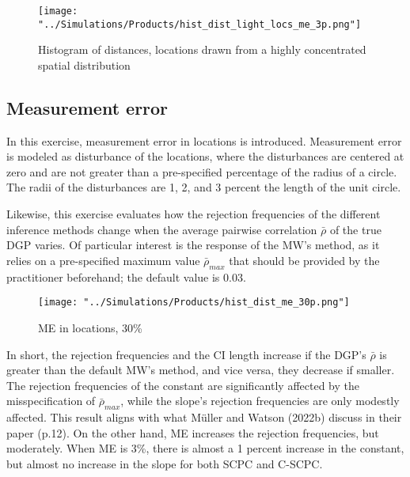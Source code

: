 \documentclass[
]{article}
\begin{document}
\begin{figure}

{\centering \texttt{[image: "../Simulations/Products/hist\_dist\_light\_locs\_me\_3p.png"]}

}

\caption{\label{fig-hist-light-locs}Histogram of distances, locations
drawn from a highly concentrated spatial distribution}

\end{figure}

\hypertarget{sec-me}{%
\subsection{Measurement error}\label{sec-me}}

In this exercise, measurement error in locations is introduced.
Measurement error is modeled as disturbance of the locations, where the
disturbances are centered at zero and are not greater than a
pre-specified percentage of the radius of a circle. The radii of the
disturbances are 1, 2, and 3 percent the length of the unit circle.

Likewise, this exercise evaluates how the rejection frequencies of the
different inference methods change when the average pairwise correlation
\(\bar\rho\) of the true DGP varies. Of particular interest is the
response of the MW's method, as it relies on a pre-specified maximum
value \(\bar\rho_{max}\) that should be provided by the practitioner
beforehand; the default value is 0.03.

\begin{figure}

{\centering \texttt{[image: "../Simulations/Products/hist\_dist\_me\_30p.png"]}

}

\caption[Histogram of distances using true and mismeasured locations
when ME is 30 percent.]{\label{fig-loc-me}ME in locations, 30\%}

\end{figure}

In short, the rejection frequencies and the CI length increase if the
DGP's \(\bar\rho\) is greater than the default MW's method, and vice
versa, they decrease if smaller. The rejection frequencies of the
constant are significantly affected by the misspecification of
\(\bar\rho_{max}\), while the slope's rejection frequencies are only
modestly affected. This result aligns with what Müller and Watson
(2022b) discuss in their paper (p.12). On the other hand, ME increases
the rejection frequencies, but moderately. When ME is 3\%, there is
almost a 1 percent increase in the constant, but almost no increase in
the slope for both SCPC and C-SCPC.
\end{document}
